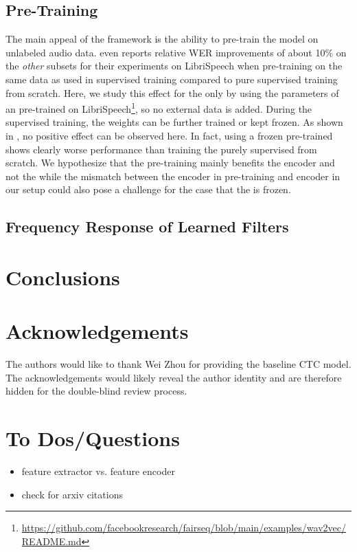 \documentclass{INTERSPEECH2023}
\begin{document}
\subsection{\wvtwo Pre-Training}
The main appeal of the \wvtwo framework is the ability to pre-train the model on unlabeled audio data.
\cite{facebook2020wav2vec2} even reports relative \gls{WER} improvements of about 10\% on the \textit{other} subsets for their experiments on LibriSpeech when pre-training on the same data as used in supervised training compared to pure supervised training from scratch.
Here, we study this effect for the \fe only by using the parameters of an \fe pre-trained on LibriSpeech\footnote{\raggedright\url{https://github.com/facebookresearch/fairseq/blob/main/examples/wav2vec/README.md}}, so no external data is added.
During the supervised training, the \fe weights can be further trained or kept frozen.
As shown in , no positive effect can be observed here.
In fact, using a frozen pre-trained \fe shows clearly worse performance than training the \fe purely supervised from scratch.
We hypothesize that the pre-training mainly benefits the \transformer encoder and not the \fe while the mismatch between the \transformer encoder in pre-training and \conformer encoder in our setup could also pose a challenge for the case that the \fe is frozen.


\subsection{Frequency Response of Learned Filters}


\section{Conclusions}

\section{Acknowledgements}

\ifinterspeechfinal
     The authors would like to thank Wei Zhou for providing the baseline \gls{CTC} model.
\else
     The acknowledgements would likely reveal the author identity and are therefore hidden for the double-blind review process.
\fi

{
\color{red}
\section{To Dos/Questions}
\begin{itemize}
  \item \wvtwo feature extractor vs. feature encoder
  \item check for arxiv citations
\end{itemize}
}



\end{document}
